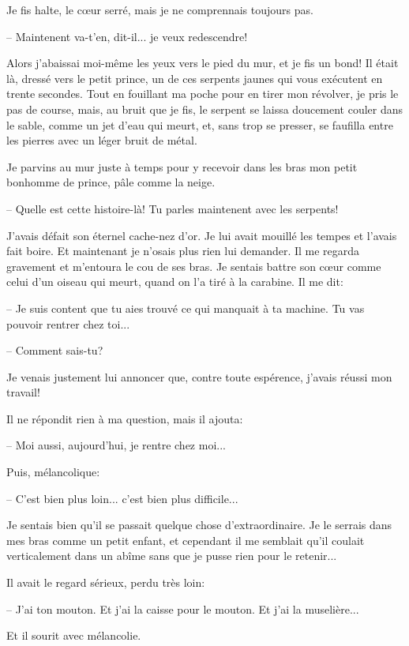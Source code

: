 \documentclass[a4paper]{report}
\begin{document}
Je fis halte, le cœur serré, mais je ne comprennais toujours pas.

-- Maintenent va-t'en, dit-il... je veux redescendre! 


Alors j'abaissai moi-même les yeux vers le pied du mur, et je fis un bond! Il était là, dressé vers le petit prince, un de ces serpents jaunes qui vous exécutent en trente secondes. Tout en fouillant ma poche pour en tirer mon révolver, je pris le pas de course, mais, au bruit que je fis, le serpent se laissa doucement couler dans le sable, comme un jet d'eau qui meurt, et, sans trop se presser, se faufilla entre les pierres avec un léger bruit de métal.

Je parvins au mur juste à temps pour y recevoir dans les bras mon petit bonhomme de prince, pâle comme la neige.

-- Quelle est cette histoire-là! Tu parles maintenent avec les serpents!

J'avais défait son éternel cache-nez d'or. Je lui avait mouillé les tempes et l'avais fait boire. Et maintenant je n'osais plus rien lui demander. Il me regarda gravement et m'entoura le cou de ses bras. Je sentais battre son cœur comme celui d'un oiseau qui meurt, quand on l'a tiré à la carabine. Il me dit:

-- Je suis content que tu aies trouvé ce qui manquait à ta machine. Tu vas pouvoir rentrer chez toi...

-- Comment sais-tu?

Je venais justement lui annoncer que, contre toute espérence, j'avais réussi mon travail!

Il ne répondit rien à ma question, mais il ajouta:

-- Moi aussi, aujourd'hui, je rentre chez moi...

Puis, mélancolique:

-- C'est bien plus loin... c'est bien plus difficile...

Je sentais bien qu'il se passait quelque chose d'extraordinaire. Je le serrais dans mes bras comme un petit enfant, et cependant il me semblait qu'il coulait verticalement dans un abîme sans que je pusse rien pour le retenir...

Il avait le regard sérieux, perdu très loin:

-- J'ai ton mouton. Et j'ai la caisse pour le mouton. Et j'ai la muselière...

Et il sourit avec mélancolie.
\end{document}
